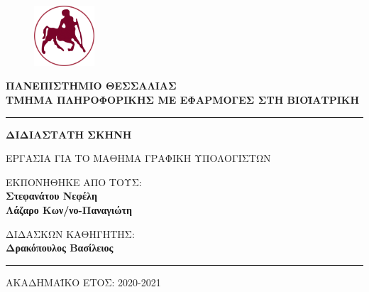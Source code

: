 

\newcommand{\thesisAuthora}{Στεφανάτου Νεφέλη}
\newcommand{\thesisAuthorb}{Λάζαρο Κων/νο-Παναγιώτη}

\newcommand{\thesisTitle}{ΔΙΔΙΑΣΤΑΤΗ ΣΚΗΝΗ }
\newcommand{\thesisSubTitle}{ΕΡΓΑΣΙΑ ΓΙΑ ΤΟ ΜΑΘΗΜΑ ΓΡΑΦΙΚΗ ΥΠΟΛΟΓΙΣΤΩΝ }
\newcommand{\professor}{Δρακόπουλος Βασίλειος}
\newcommand{\academicYear}{2020-2021}

\begin{titlepage}
\thispagestyle{empty}


\begin{figure}
\centering
\vspace{-2cm}
    \hspace*{0cm}\includegraphics[width = 0.2\textwidth]{uth_logo.png}\hspace*{0cm}
\end{figure}


\centering 
\textcolor{uthred} {\large \textbf{ΠΑΝΕΠΙΣΤΗΜΙΟ ΘΕΣΣΑΛΙΑΣ}}\\
\vspace{0.2cm}
\textcolor{uthred}{\textbf{ΤΜΗΜΑ ΠΛΗΡΟΦΟΡΙΚΗΣ ΜΕ ΕΦΑΡΜΟΓΕΣ ΣΤΗ ΒΙΟΪΑΤΡΙΚΗ}}\\

\rule[-0.2cm]{\linewidth}{0.5pt}

\vspace{3cm}
\par
\noindent
\Huge
\centering
\textbf{\thesisTitle}\\
\vspace{0.2cm}
\small
\par
\noindent
\thesisSubTitle\\
\Large


\vspace{2cm}
\noindent
\Large
ΕΚΠΟΝΗΘΗΚΕ ΑΠΟ ΤΟΥΣ:\\
\textbf{\thesisAuthora}\\
\textbf{\thesisAuthorb}\\
\vspace{3 cm}

\par \noindent
\Large
ΔΙΔΑΣΚΩΝ ΚΑΘΗΓΗΤΗΣ:\\ \textbf{\professor}\\
\vspace{2.5cm}

\rule[0.2cm]{\linewidth}{0.5pt}

ΑΚΑΔΗΜΑΪΚΟ ΕΤΟΣ: \academicYear

\end{titlepage}
